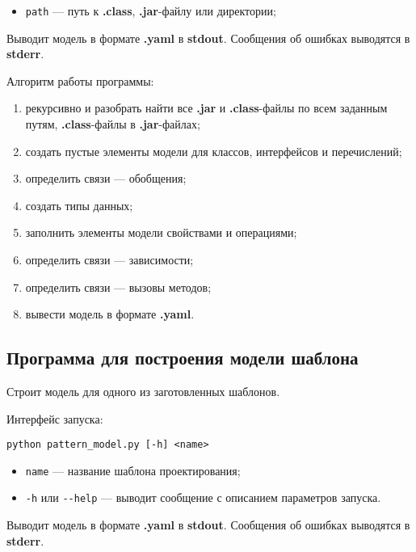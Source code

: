 \begin{itemize}
\item \verb;path; --- путь к \textbf{.class}, \textbf{.jar}-файлу или директории;
\end{itemize}

Выводит модель в формате \textbf{.yaml} в \textbf{stdout}.
Сообщения об ошибках выводятся в \textbf{stderr}.

Алгоритм работы программы:
\begin{enumerate}
\item рекурсивно и разобрать найти все \textbf{.jar} и \textbf{.class}-файлы по
всем заданным путям, \textbf{.class}-файлы в \textbf{.jar}-файлах;
\item создать пустые элементы модели для классов, интерфейсов и перечислений;
\item определить связи --- обобщения;
\item создать типы данных;
\item заполнить элементы модели свойствами и операциями;
\item определить связи --- зависимости;
\item определить связи --- вызовы методов;
\item вывести модель в формате \textbf{.yaml}.
\end{enumerate}

\subsection{Программа для построения модели шаблона}

Строит модель для одного из заготовленных шаблонов.

Интерфейс запуска:
\begin{verbatim}
python pattern_model.py [-h] <name>
\end{verbatim}

\begin{itemize}
\item \verb;name; --- название шаблона проектирования;
\item \verb;-h; или \verb;--help; --- выводит сообщение с описанием параметров
запуска.
\end{itemize}

Выводит модель в формате \textbf{.yaml} в \textbf{stdout}.
Сообщения об ошибках выводятся в \textbf{stderr}.

